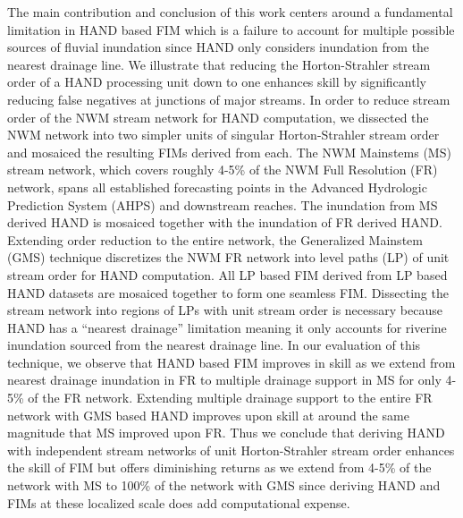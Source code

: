 \documentclass[draft]{dependencies/agujournal2019}
\begin{document}
The main contribution and conclusion of this work centers around a fundamental limitation in HAND based FIM which is a failure to account for multiple possible sources of fluvial inundation since HAND only considers inundation from the nearest drainage line.
We illustrate that reducing the Horton-Strahler stream order of a HAND processing unit down to one enhances skill by significantly reducing false negatives at junctions of major streams.
In order to reduce stream order of the NWM stream network for HAND computation, we dissected the NWM network into two simpler units of singular Horton-Strahler stream order and mosaiced the resulting FIMs derived from each.
The NWM Mainstems (MS) stream network, which covers roughly 4-5\% of the NWM Full Resolution (FR) network, spans all established forecasting points in the Advanced Hydrologic Prediction System (AHPS) and downstream reaches.
The inundation from MS derived HAND is mosaiced together with the inundation of FR derived HAND.
Extending order reduction to the entire network, the Generalized Mainstem (GMS) technique discretizes the NWM FR network into level paths (LP) of unit stream order for HAND computation.
All LP based FIM derived from LP based HAND datasets are mosaiced together to form one seamless FIM.
Dissecting the stream network into regions of LPs with unit stream order is necessary because HAND has a ``nearest drainage'' limitation meaning it only accounts for riverine inundation sourced from the nearest drainage line.
In our evaluation of this technique, we observe that HAND based FIM improves in skill as we extend from nearest drainage inundation in FR to multiple drainage support in MS for only 4-5\% of the FR network.
Extending multiple drainage support to the entire FR network with GMS based HAND improves upon skill at around the same magnitude that MS improved upon FR.
Thus we conclude that deriving HAND with independent stream networks of unit Horton-Strahler stream order enhances the skill of FIM but offers diminishing returns as we extend from 4-5\% of the network with MS to 100\% of the network with GMS since deriving HAND and FIMs at these localized scale does add computational expense.
\end{document}
